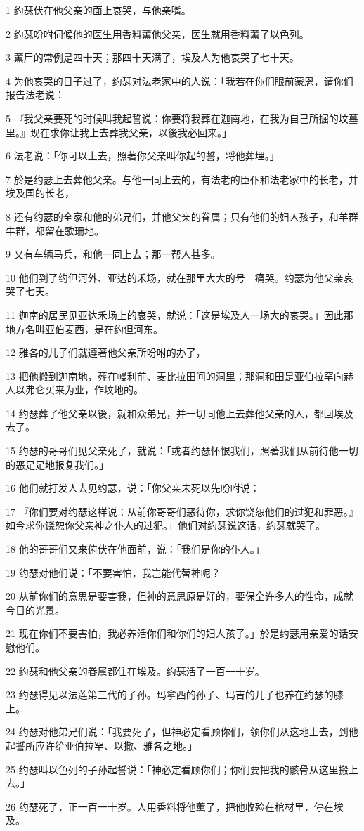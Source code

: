 \par 1 约瑟伏在他父亲的面上哀哭，与他亲嘴。
\par 2 约瑟吩咐伺候他的医生用香料薰他父亲，医生就用香料薰了以色列。
\par 3 薰尸的常例是四十天；那四十天满了，埃及人为他哀哭了七十天。
\par 4 为他哀哭的日子过了，约瑟对法老家中的人说：「我若在你们眼前蒙恩，请你们报告法老说：
\par 5 『我父亲要死的时候叫我起誓说：你要将我葬在迦南地，在我为自己所掘的坟墓里。』现在求你让我上去葬我父亲，以後我必回来。」
\par 6 法老说：「你可以上去，照著你父亲叫你起的誓，将他葬埋。」
\par 7 於是约瑟上去葬他父亲。与他一同上去的，有法老的臣仆和法老家中的长老，并埃及国的长老，
\par 8 还有约瑟的全家和他的弟兄们，并他父亲的眷属；只有他们的妇人孩子，和羊群牛群，都留在歌珊地。
\par 9 又有车辆马兵，和他一同上去；那一帮人甚多。
\par 10 他们到了约但河外、亚达的禾场，就在那里大大的号　痛哭。约瑟为他父亲哀哭了七天。
\par 11 迦南的居民见亚达禾场上的哀哭，就说：「这是埃及人一场大的哀哭。」因此那地方名叫亚伯麦西，是在约但河东。
\par 12 雅各的儿子们就遵著他父亲所吩咐的办了，
\par 13 把他搬到迦南地，葬在幔利前、麦比拉田间的洞里；那洞和田是亚伯拉罕向赫人以弗仑买来为业，作坟地的。
\par 14 约瑟葬了他父亲以後，就和众弟兄，并一切同他上去葬他父亲的人，都回埃及去了。
\par 15 约瑟的哥哥们见父亲死了，就说：「或者约瑟怀恨我们，照著我们从前待他一切的恶足足地报复我们。」
\par 16 他们就打发人去见约瑟，说：「你父亲未死以先吩咐说：
\par 17 『你们要对约瑟这样说：从前你哥哥们恶待你，求你饶恕他们的过犯和罪恶。』如今求你饶恕你父亲神之仆人的过犯。」他们对约瑟说这话，约瑟就哭了。
\par 18 他的哥哥们又来俯伏在他面前，说：「我们是你的仆人。」
\par 19 约瑟对他们说：「不要害怕，我岂能代替神呢？
\par 20 从前你们的意思是要害我，但神的意思原是好的，要保全许多人的性命，成就今日的光景。
\par 21 现在你们不要害怕，我必养活你们和你们的妇人孩子。」於是约瑟用亲爱的话安慰他们。
\par 22 约瑟和他父亲的眷属都住在埃及。约瑟活了一百一十岁。
\par 23 约瑟得见以法莲第三代的子孙。玛拿西的孙子、玛吉的儿子也养在约瑟的膝上。
\par 24 约瑟对他弟兄们说：「我要死了，但神必定看顾你们，领你们从这地上去，到他起誓所应许给亚伯拉罕、以撒、雅各之地。」
\par 25 约瑟叫以色列的子孙起誓说：「神必定看顾你们；你们要把我的骸骨从这里搬上去。」
\par 26 约瑟死了，正一百一十岁。人用香料将他薰了，把他收殓在棺材里，停在埃及。


